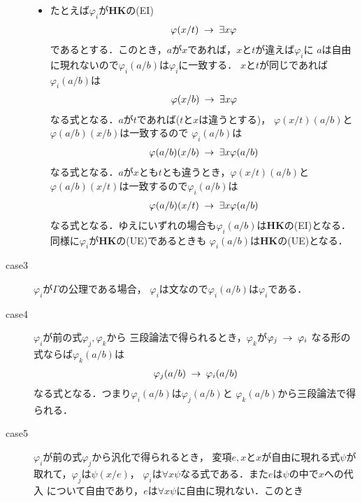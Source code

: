 \begin{metaprf}
\begin{description}
\begin{itemize}
					\item たとえば$\varphi_{i}$が{\bf HK}の(EI)
						\begin{align}
							\varphi(x/t) \hspace{0.25em}\rightarrow\hspace{0.25em} \exists x \varphi
						\end{align}
						であるとする．このとき，$a$が$x$であれば，$x$と$t$が違えば$\varphi_{i}$に
						$a$は自由に現れないので$\varphi_{i}(a/b)$は$\varphi_{i}$に一致する．
						$x$と$t$が同じであれば$\varphi_{i}(a/b)$は
						\begin{align}
							\varphi(x/b) \hspace{0.25em}\rightarrow\hspace{0.25em} \exists x \varphi
						\end{align}
						なる式となる．$a$が$t$であれば($t$と$x$は違うとする)，
						$\varphi(x/t)(a/b)$と$\varphi(a/b)(x/b)$は一致するので
						$\varphi_{i}(a/b)$は
						\begin{align}
							\varphi(a/b)(x/b) \hspace{0.25em}\rightarrow\hspace{0.25em} \exists x \varphi(a/b)
						\end{align}
						なる式となる．$a$が$x$とも$t$とも違うとき，$\varphi(x/t)(a/b)$と
						$\varphi(a/b)(x/t)$は一致するので$\varphi_{i}(a/b)$は
						\begin{align}
							\varphi(a/b)(x/t) \hspace{0.25em}\rightarrow\hspace{0.25em} \exists x \varphi(a/b)
						\end{align}
						なる式となる．ゆえにいずれの場合も$\varphi_{i}(a/b)$は{\bf HK}の(EI)となる．
						同様に$\varphi_{i}$が{\bf HK}の(UE)であるときも
						$\varphi_{i}(a/b)$は{\bf HK}の(UE)となる．
				\end{itemize}
				
			\item[case3] $\varphi_{i}$が$\Gamma$の公理である場合，
				$\varphi_{i}$は文なので$\varphi_{i}(a/b)$は$\varphi_{i}$である．
			
			\item[case4] $\varphi_{i}$が前の式$\varphi_{j},\varphi_{k}$から
				三段論法で得られるとき，$\varphi_{k}$が$\varphi_{j} \hspace{0.25em}\rightarrow\hspace{0.25em} \varphi_{i}$
				なる形の式ならば$\varphi_{k}(a/b)$は
				\begin{align}
					\varphi_{j}(a/b) \hspace{0.25em}\rightarrow\hspace{0.25em} \varphi_{i}(a/b)
				\end{align}
				なる式となる．つまり$\varphi_{i}(a/b)$は$\varphi_{j}(a/b)$と
				$\varphi_{k}(a/b)$から三段論法で得られる．
				
			\item[case5] $\varphi_{i}$が前の式$\varphi_{j}$から汎化で得られるとき，
				変項$e,x$と$x$が自由に現れる式$\psi$が取れて，$\varphi_{j}$は$\psi(x/e)$，
				$\varphi_{i}$は$\forall x \psi$なる式である．また$e$は$\psi$の中で$x$への代入
				について自由であり，$e$は$\forall x \psi$に自由に現れない．このとき
				

\end{description}
\end{metaprf}
